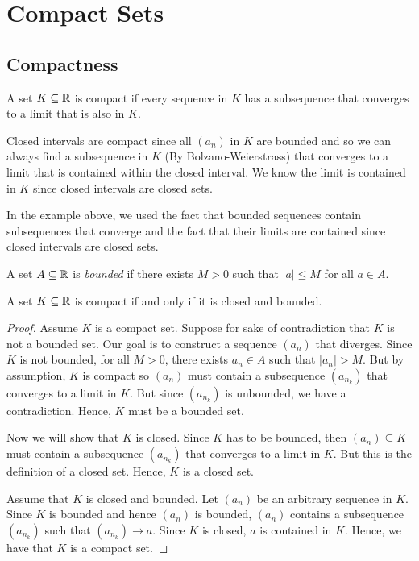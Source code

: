 
\section{Compact Sets}

\subsection{Compactness}
\begin{definition}
A set \( K \subseteq \mathbb{R} \) is compact if every sequence in \( K \) has a subsequence that converges to a limit that is also in \( K \).
\end{definition}

    Closed intervals are compact since all \( (a_n) \) in \( K \) are bounded and so we can always find a subsequence in \( K \) (By Bolzano-Weierstrass) that converges to a limit that is contained within the closed interval. We know the limit is contained in \( K \) since closed intervals are closed sets. 

In the example above, we used the fact that bounded sequences contain subsequences that converge and the fact that their limits are contained since closed intervals are closed sets. 

\begin{definition}
A set \( A \subseteq \mathbb{R} \) is \textit{bounded} if there exists \( M > 0  \) such that \( | a | \leq M  \) for all \( a \in A \).
\end{definition}

\begin{theorem}
    A set \( K \subseteq \mathbb{R} \) is compact if and only if it is closed and bounded.
    \end{theorem}

\begin{proof}
    Assume \( K \) is a compact set. Suppose for sake of contradiction that \( K \) is not a bounded set. Our goal is to construct a sequence \( (a_n) \) that diverges. Since \( K \) is not bounded, for all \( M > 0  \), there exists \( a_n \in A \) such that \( | a_n | > M  \). But by assumption, \( K \) is compact so \( (a_n) \) must contain a subsequence \( (a_{n_k}) \) that converges to a limit in \( K \). But since \( (a_{n_k}) \) is unbounded, we have a contradiction. Hence, \( K \) must be a bounded set. 

    Now we will show that \( K \) is closed. Since \( K \) has to be bounded, then \( (a_n) \subseteq K  \) must contain a subsequence \( (a_{n_k}) \) that converges to a limit in \( K \). But this is the definition of a closed set. Hence, \( K \) is a closed set.

    Assume that \( K \) is closed and bounded. Let \( (a_n) \) be an arbitrary sequence in \( K \). Since \( K  \) is bounded and hence \( (a_n) \) is bounded, \( (a_n) \) contains a subsequence \( (a_{n_k}) \) such that \( (a_{n_k}) \to a  \). Since \( K  \) is closed, \( a  \) is contained in \( K \). Hence, we have that \( K \) is a compact set.
\end{proof}

